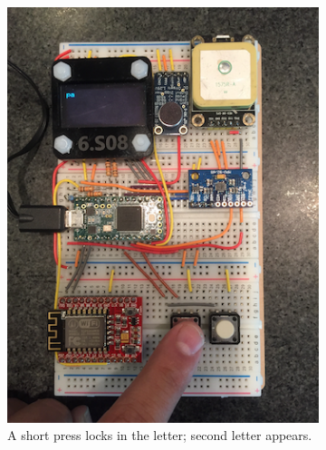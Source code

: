\documentclass[12pt]{article}
\begin{document}
\begin{figure}
\begin{subfigure}[b]{.3\linewidth}
\includegraphics[width=\linewidth]{text-pa}
\caption{A short press locks in the letter; second letter appears.}
\label{fig:text-pa}
\end{subfigure}
\begin{subfigure}[b]{.3\linewidth}

\end{subfigure}
\end{figure}
\end{document}
